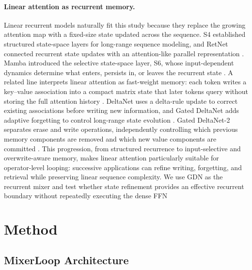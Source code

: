 \documentclass{article}
\begin{document}
\paragraph{Linear attention as recurrent memory.}
Linear recurrent models naturally fit this study because they replace the
growing attention map with a fixed-size state updated across the sequence. S4
established structured state-space layers for long-range sequence modeling, and
RetNet connected recurrent state updates with an attention-like parallel
representation \cite{gu2022efficientlymodelinglong,sun2023retentivenetworksuccessor}.
Mamba introduced the selective state-space layer, S6, whose input-dependent
dynamics determine what enters, persists in, or leaves the recurrent state
\cite{gu2024mambalineartimesequence}. A related line interprets linear
attention as fast-weight memory: each token writes a key--value association into
a compact matrix state that later tokens query without storing the full
attention history \cite{schlag2021lineartransformerssecretlyfast}. DeltaNet
uses a delta-rule update to correct existing associations before writing new
information, and Gated DeltaNet adds adaptive forgetting to control long-range
state evolution \cite{yang2025gateddeltanetworksimproving}. Gated DeltaNet-2
separates erase and write operations, independently controlling which previous
memory components are removed and which new value components are committed
\cite{hatamizadeh2026gateddeltanet2}. This progression, from structured
recurrence to input-selective and overwrite-aware memory, makes linear
attention particularly suitable for operator-level looping: successive
applications can refine writing, forgetting, and retrieval while preserving
linear sequence complexity. We use GDN as the recurrent mixer and test whether state refinement provides an effective recurrent boundary without repeatedly executing the dense FFN


\section{Method}

\subsection{MixerLoop Architecture}
\end{document}
